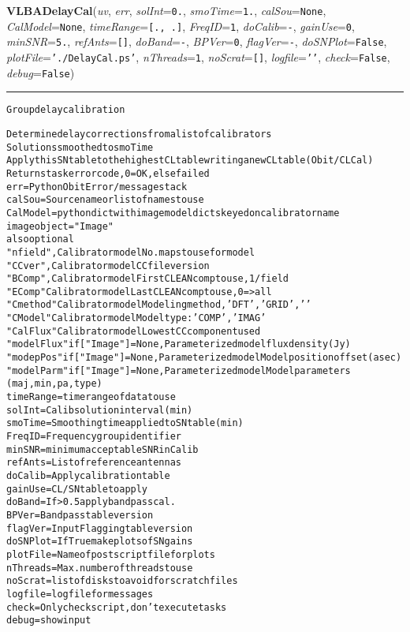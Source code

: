     \begin{boxedminipage}{\textwidth}

    \raggedright \textbf{VLBADelayCal}(\textit{uv}, \textit{err}, \textit{solInt}=\texttt{0\-.\-}, \textit{smoTime}=\texttt{1\-.\-}, \textit{calSou}=\texttt{N\-o\-n\-e\-}, \textit{CalModel}=\texttt{N\-o\-n\-e\-}, \textit{timeRange}=\texttt{[\-.\-,\-~\-.\-]\-}, \textit{FreqID}=\texttt{1\-}, \textit{doCalib}=\texttt{-\-}, \textit{gainUse}=\texttt{0\-}, \textit{minSNR}=\texttt{5\-.\-}, \textit{refAnts}=\texttt{[\-]\-}, \textit{doBand}=\texttt{-\-}, \textit{BPVer}=\texttt{0\-}, \textit{flagVer}=\texttt{-\-}, \textit{doSNPlot}=\texttt{F\-a\-l\-s\-e\-}, \textit{plotFile}=\texttt{'\-.\-/\-D\-e\-l\-a\-y\-C\-a\-l\-.\-p\-s\-'\-}, \textit{nThreads}=\texttt{1\-}, \textit{noScrat}=\texttt{[\-]\-}, \textit{logfile}=\texttt{'\-'\-}, \textit{check}=\texttt{F\-a\-l\-s\-e\-}, \textit{debug}=\texttt{F\-a\-l\-s\-e\-})

    \vspace{-1.5ex}

    \rule{\textwidth}{0.5\fboxrule}
\begin{alltt}
Group delay calibration

Determine delay corrections from a list of calibrators
Solutions smoothed to smoTime
Apply this SN table to the highest CL table writing a new CL table (Obit/CLCal)
Returns task error code, 0=OK, else failed
err        = Python Obit Error/message stack
calSou     = Source name or list of names to use
CalModel = python dict with image model dicts keyed on calibrator name
           image object = "Image"
           also optional
           "nfield",    Calibrator model  No. maps to use for model
           "CCver",     Calibrator model CC file version
           "BComp",     Calibrator model First CLEAN comp to use, 1/field
           "EComp"      Calibrator model  Last CLEAN comp to use, 0={\textgreater}all
           "Cmethod"    Calibrator model Modeling method, 'DFT','GRID','    '
           "CModel"     Calibrator model Model type: 'COMP','IMAG'
           "CalFlux"    Calibrator model  Lowest CC component used
           "modelFlux"  if ["Image"]=None, Parameterized model flux density (Jy)
           "modepPos"   if ["Image"]=None, Parameterized model Model position offset (asec)
           "modelParm"  if ["Image"]=None, Parameterized model Model parameters
                        (maj, min, pa, type)
timeRange  = timerange of data to use
solInt     = Calib solution interval (min)
smoTime    = Smoothing time applied to SN table (min)
FreqID     = Frequency group identifier
minSNR     = minimum acceptable SNR in Calib
refAnts    = List of reference antennas
doCalib    = Apply calibration table
gainUse    = CL/SN table to apply
doBand     = If {\textgreater}0.5 apply bandpass cal.
BPVer      = Bandpass table version
flagVer    = Input Flagging table version
doSNPlot   = If True make plots of SN gains
plotFile   = Name of postscript file for plots
nThreads   = Max. number of threads to use
noScrat    = list of disks to avoid for scratch files
logfile    = logfile for messages
check      = Only check script, don't execute tasks
debug      = show input\end{alltt}


\end{boxedminipage}
